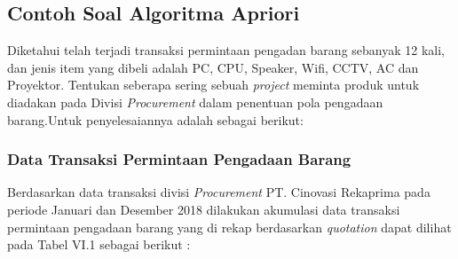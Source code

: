 \subsection{Contoh Soal Algoritma Apriori}
Diketahui telah terjadi transaksi permintaan pengadan barang sebanyak 12 kali, dan jenis item yang dibeli adalah PC, CPU, Speaker, Wifi, CCTV, AC dan Proyektor. Tentukan seberapa sering sebuah \textit{project} meminta produk untuk diadakan pada Divisi \textit{Procurement} dalam penentuan pola pengadaan barang.Untuk penyelesaiannya adalah sebagai berikut:

\subsubsection{Data Transaksi Permintaan Pengadaan Barang}
Berdasarkan data transaksi divisi \textit{Procurement} PT. Cinovasi Rekaprima pada periode Januari dan Desember 2018 dilakukan akumulasi data transaksi permintaan pengadaan barang yang di rekap berdasarkan \textit{quotation} dapat dilihat pada Tabel VI.1 sebagai berikut :
